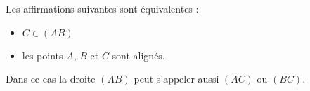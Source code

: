 \begin{pageCours}
\begin{Rq}
Les affirmations suivantes sont équivalentes :
\begin{itemize}
\item $C\in (AB)$
\item les points $A$, $B$ et $C$ sont alignés.
\end{itemize}
Dans ce cas la droite $(AB)$ peut s'appeler aussi $(AC)$ ou $(BC)$.
\end{Rq}


\end{pageCours}
